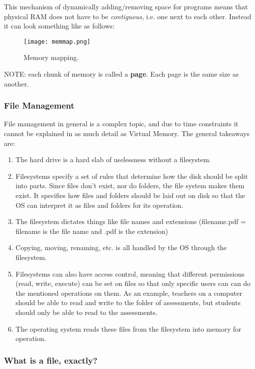 \documentclass[../main.tex]{subfiles}
\begin{document}
This mechanism of dynamically adding/removing space for programs means that physical RAM does not have to be \emph{contiguous}, i.e. one next to each other. Instead it can look something like as follows:

\begin{figure}[H]
    \centering
    \texttt{[image: memmap.png]}
    \caption{Memory mapping.}
    \label{fig:memmap}
\end{figure}

NOTE: each chunk of memory is called a \textbf{page}. Each page is the same size as another.

\subsubsection{File Management}

File management in general is a complex topic, and due to time constraints it cannot be explained in as much detail as Virtual Memory. The general takeaways are:

\begin{enumerate}
    \item The hard drive is a hard slab of uselessness without a filesystem.
    \item Filesystems specify a set of rules that determine how the disk should be split into parts. Since files don't exist, nor do folders, the file system makes them exist. It specifies how files and folders should be laid out on disk so that the OS can interpret it as files and folders for its operation.
    \item The filesystem dictates things like file names and extensions (filename.pdf = filename is the file name and .pdf is the extension)
    \item Copying, moving, renaming, etc. is all handled by the OS through the filesystem.
    \item Filesystems can also have access control, meaning that different permissions (read, write, execute) can be set on files so that only specific users can can do the mentioned operations on them. As an example, teachers on a computer should be able to read and write to the folder of assessments, but students should only be able to read to the assessments.
    \item The operating system reads these files from the filesystem into memory for operation.
\end{enumerate}

\subsubsection{What is a file, exactly?}
\end{document}
